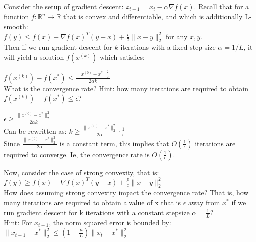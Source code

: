 \begin{Parts}
\Part Consider the setup of gradient descent: $x_{t+1} = x_t - \alpha \nabla f(x)$. Recall that for a function $f : \mathbb{R}^n \rightarrow \mathbb{R}$ that is convex and differentiable, and which is additionally L-smooth: \\
    $f(y) \leq f(x) + \nabla f(x)^T(y-x) + \frac{L}{2} \|x-y\|_2^2$  for any $x, y$. \\ Then if we run gradient descent for $k$ iterations with a fixed step size $\alpha = 1/L$, it will yield a solution $f(x^{(k)})$
    which satisfies:

    $f(x^{(k)}) - f(x^*) \leq \frac{\| x^{(0)} - x^* \|_2^2} {2 \alpha k}$ \\

    What is the convergence rate? Hint: how many iterations are required to obtain $f(x^{(k)}) - f(x^*) \leq \epsilon $? \\

\begin{solution}
     $\epsilon \geq \frac{\| x^{(0)} - x^* \|_2^2} {2 \alpha k}$ \\
     Can be rewritten as: $k \geq  \frac{\| x^{(0)} - x^* \|_2^2} {2 \alpha} \cdot \frac{1}{\epsilon}$ \\
     Since $\frac{\| x^{(0)} - x^* \|_2^2} {2 \alpha}$ is a constant term, this implies that $O(\frac{1}{\epsilon})$ iterations are required to converge. 
     Ie, the convergence rate is $O(\frac{1}{\epsilon})$. 
\end{solution}

\Part Now, consider the case of strong convexity, that is: \\
    $f(y) \geq f(x) + \nabla f(x)^T(y-x) + \frac{\mu}{2} \|x -y\|_2^2$   \\

    How does assuming strong convexity impact the convergence rate? That is, how many iterations are required to obtain a value of x that is $\epsilon$ away from $x^*$ if we run gradient descent for k iterations with a constant stepsize $\alpha = \frac{1}{L}$?\\
    Hint: For $x_{t+1}$, the norm squared error is bounded by: $\|x_{t+1}-x^*\|_2^2 \leq (1 - \frac{\mu}{L})\|x_{t} - x^* \|_2^2$


\end{Parts}
